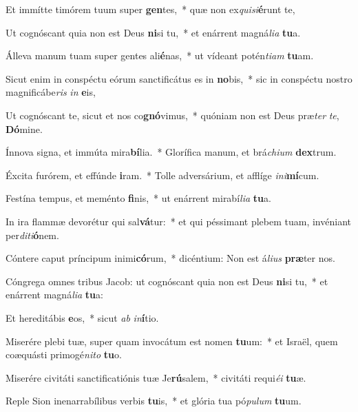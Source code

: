 \item Et immítte timórem tuum super \textbf{gen}tes,~* quæ non ex\textit{qui}\textit{si}\textbf{é}runt te,
\item Ut cognóscant quia non est Deus \textbf{ni}si tu,~* et enárrent magná\textit{li}\textit{a} \textbf{tu}a.
\item Álleva manum tuam super gentes ali\textbf{é}nas,~* ut vídeant potén\textit{ti}\textit{am} \textbf{tu}am.
\item Sicut enim in conspéctu eórum sanctificátus es in \textbf{no}bis,~* sic in conspéctu nostro magnificábe\textit{ris} \textit{in} \textbf{e}is,
\item Ut cognóscant te, sicut et nos co\textbf{gnó}vimus,~* quóniam non est Deus præ\textit{ter} \textit{te}, \textbf{Dó}mine.
\item Ínnova signa, et immúta mira\textbf{bí}lia.~* Glorífica manum, et brá\textit{chi}\textit{um} \textbf{dex}trum.
\item Éxcita furórem, et effúnde \textbf{i}ram.~* Tolle adversárium, et afflíge \textit{in}\textit{i}\textbf{mí}cum.
\item Festína tempus, et meménto \textbf{fi}nis,~* ut enárrent mirabí\textit{li}\textit{a} \textbf{tu}a.
\item In ira flammæ devorétur qui sal\textbf{vá}tur:~* et qui péssimant plebem tuam, invéniant per\textit{di}\textit{ti}\textbf{ó}nem.
\item Cóntere caput príncipum inimi\textbf{có}rum,~* dicéntium: Non est á\textit{li}\textit{us} \textbf{præ}ter nos.
\item Cóngrega omnes tribus Jacob: ut cognóscant quia non est Deus \textbf{ni}si tu,~* et enárrent magná\textit{li}\textit{a} \textbf{tu}a:
\item Et hereditábis \textbf{e}os,~* sicut \textit{ab} \textit{in}\textbf{í}tio.
\item Miserére plebi tuæ, super quam invocátum est nomen \textbf{tu}um:~* et Israël, quem coæquásti primogé\textit{ni}\textit{to} \textbf{tu}o.
\item Miserére civitáti sanctificatiónis tuæ Je\textbf{rú}salem,~* civitáti requi\textit{é}\textit{i} \textbf{tu}æ.
\item Reple Sion inenarrabílibus verbis \textbf{tu}is,~* et glória tua pó\textit{pu}\textit{lum} \textbf{tu}um.
